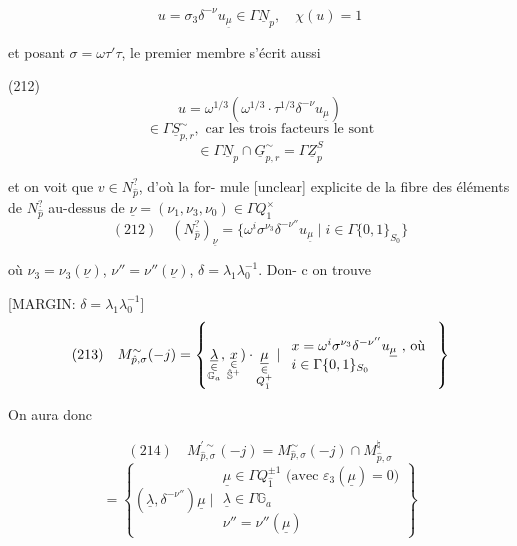 $$ u = \sigma_3 \delta^{-\nu} u_{\underline{\mu}} \in \Gamma \underline{N}_p , \quad \chi(u) = 1 $$

et posant $\sigma = \omega \tau' \tau$, le premier membre s'écrit aussi

(212) $$ u = \omega^{1/3} ( \omega^{1/3} \cdot \tau^{1/3} \delta^{-\nu} u_{\underline{\mu}} ) $$
$$ \in \Gamma \underline{S}_{p,r}^\sim , \text{ car les trois facteurs le sont} $$
$$ \in \Gamma \underline{N}_p \cap \underline{G}_{p,r}^\sim = \Gamma \underline{Z}_p^S $$

\newpage


et on voit que $v \in N_{\hat{p}}^?$, d'où la for-
mule [unclear] explicite de la
fibre des éléments de $N_{\hat{p}}^?$ au-dessus
de $\underline{\nu} = (\nu_1, \nu_3, \nu_0) \in \Gamma Q_{\hat{1}}^\times$
$$ (212) \quad (N_{\hat{p}}^?)_{\underline{\nu}} = \{ \omega^i \sigma^{\nu_3} \delta^{-\nu''} u_{\underline{\mu}} \mid i \in \Gamma \{0,1\}_{S_0} \} $$

où $\nu_3 = \nu_3(\underline{\nu})$, $\nu'' = \nu''(\underline{\nu})$, $\delta = \lambda_1 \lambda_0^{-1}$. Don-
c on trouve

[MARGIN: $\delta = \lambda_1 \lambda_0^{-1}$]
$$ (213) \quad M_{\hat{p}, \sigma}^\sim (-j) = \left\{ \underset{\begin{subarray}{c} \in \\ \mathbb{G}_a \end{subarray}}{\underline{\lambda}}, \underset{\begin{subarray}{c} \in \\ \hat{\mathbb{S}}^+ \end{subarray}}{x}) \cdot \underset{\begin{subarray}{c} \in \\ Q_{\hat{1}}^+ \end{subarray}}{\underline{\mu}} \mid \begin{array}{l} x = \omega^i \sigma^{\nu_3} \delta^{-\nu''} u_{\underline{\mu}} \text{ , où } \\ i \in \Gamma \{0,1\}_{S_0} \end{array} \right\} $$

On aura donc

$$ (214) \quad M_{\hat{p}, \sigma}^{\prime \sim} (-j) = M_{\hat{p}, \sigma}^\sim (-j) \cap M_{\hat{p}, \sigma}^\natural $$
$$ = \left\{ (\underline{\lambda}, \delta^{-\nu''}) \underline{\mu} \mid \begin{array}{l} \underline{\mu} \in \Gamma Q_{\hat{1}}^{\pm 1} \text{ (avec } \varepsilon_3(\underline{\mu})=0 \text{)} \\ \underline{\lambda} \in \Gamma \mathbb{G}_a \\ \nu'' = \nu''(\underline{\mu}) \end{array} \right\} $$

